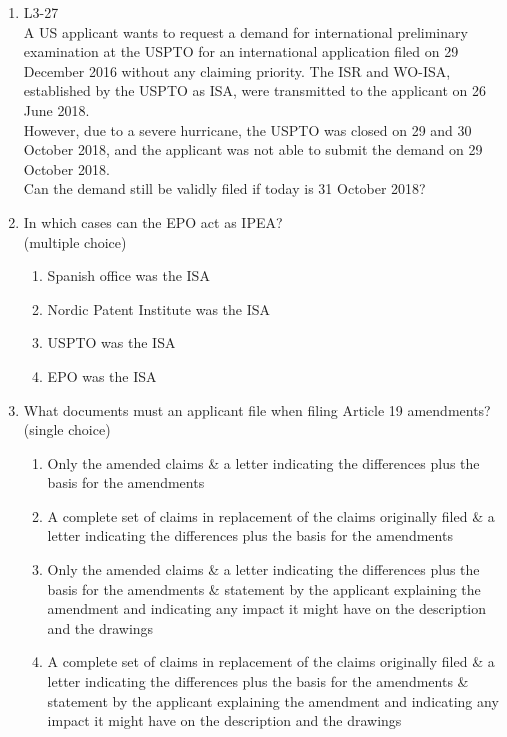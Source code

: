 \documentclass{report}
\begin{document}
\begin{enumerate}[label=\textbf{Question \arabic*}]
    \item %
    L3-27 \\
    A US applicant wants to request a demand for international preliminary examination at the USPTO for an international application filed on 29 December 2016 without any claiming priority. The ISR and WO-ISA, established by the USPTO as ISA, were transmitted to the applicant on 26 June 2018. \\
    However, due to a severe hurricane, the USPTO was closed on 29 and 30 October 2018, and the applicant was not able to submit the demand on 29 October 2018. \\
    Can the demand still be validly filed if today is 31 October 2018?

    \item %
    In which cases can the EPO act as IPEA? \\
    (multiple choice)
    \begin{enumerate}[label=(\alph*)]
        \item Spanish office was the ISA
        \item Nordic Patent Institute was the ISA
        \item USPTO was the ISA
        \item EPO was the ISA
    \end{enumerate}

    \item %
    What documents must an applicant file when filing Article 19 amendments? \\
    (single choice)
    \begin{enumerate}[label=(\alph*)]
        \item Only the amended claims \& a letter indicating the differences plus the basis for the amendments
        \item A complete set of claims in replacement of the claims originally filed \& a letter indicating the differences plus the basis for the amendments 
        \item Only the amended claims \& a letter indicating the differences plus the basis for the amendments \& statement by the applicant explaining the amendment and indicating any impact it might have on the description and the drawings
        \item A complete set of claims in replacement of the claims originally filed \& a letter indicating the differences plus the basis for the amendments \& statement by the applicant explaining the amendment and indicating any impact it might have on the description and the drawings
    \end{enumerate}


\end{enumerate}
\end{document}
